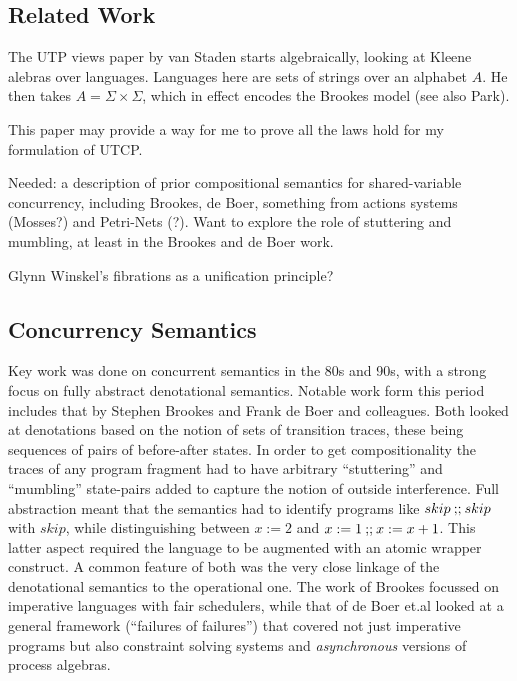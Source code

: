 \subsection{Related Work}\label{ssec:related}

The UTP views paper by van Staden\cite{DBLP:conf/utp/Staden14}
starts algebraically, looking at Kleene alebras over languages.
Languages here are sets of strings over an alphabet $A$.
He then takes $A =\Sigma\times\Sigma$,
which in effect encodes the Brookes model\cite{DBLP:journals/iandc/Brookes96}
(see also Park\cite{conf/ac/Park79}).

This paper may provide a way for me to prove all the laws hold for
my formulation of UTCP.


Needed: a description of prior compositional semantics
for shared-variable concurrency,
including Brookes, de Boer, something from actions systems (Mosses?)
and Petri-Nets (?).
Want to explore the role of stuttering and mumbling,
at least in the Brookes and de Boer work.

Glynn Winskel's fibrations as a unification principle?


\subsection{Concurrency Semantics}

Key work was done on concurrent semantics in the 80s and 90s,
with a strong focus on fully abstract denotational
semantics.
Notable work form this period includes that by
Stephen Brookes\cite{DBLP:journals/iandc/Brookes96}
and Frank de Boer and colleagues\cite{DBLP:conf/concur/BoerKPR91}.
Both looked at denotations based on the notion of sets of transition traces,
these being sequences of pairs of before-after states.
In order to get compositionality the traces of any program fragment
had to have arbitrary ``stuttering'' and ``mumbling'' state-pairs
added to capture the notion of outside interference.
Full abstraction meant that the semantics had to identify
programs like $skip\mathbin{;\!;} skip$ with $skip$,
while distinguishing between $x:=2$ and $x:=1\mathbin{;\!;} x:=x+1$.
This latter aspect required the language to be augmented with
an atomic wrapper construct.
A common feature of both was the very close linkage of the denotational
semantics to the operational one.
The work of Brookes\cite{DBLP:journals/iandc/Brookes96}
focussed on imperative languages with fair schedulers,
while that of de Boer et.al\cite{DBLP:conf/concur/BoerKPR91}
looked at a general framework (``failures of failures'')
that covered not just imperative programs
but also constraint solving systems
and \emph{asynchronous} versions of process algebras.


